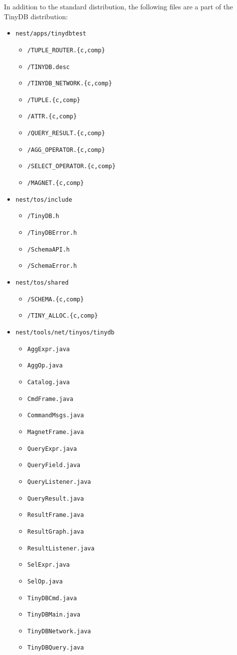\documentclass[11pt]{article}
\renewcommand{\baselinestretch}{1.2}
\begin{document}
In addition to the standard distribution, the following files are a
part of the TinyDB distribution:

\renewcommand{\baselinestretch}{.9}\rm
\begin{itemize}
\item {\tt nest/apps/tinydbtest}
\begin{itemize}
\item {\tt /TUPLE\_ROUTER.\{c,comp\}}
\item {\tt /TINYDB.desc}
\item {\tt /TINYDB\_NETWORK.\{c,comp\}}
\item {\tt /TUPLE.\{c,comp\}}
\item {\tt /ATTR.\{c,comp\}}
\item {\tt /QUERY\_RESULT.\{c,comp\}}
\item {\tt /AGG\_OPERATOR.\{c,comp\}}
\item {\tt /SELECT\_OPERATOR.\{c,comp\}}
\item {\tt /MAGNET.\{c,comp\}}
\end{itemize}
\item {\tt nest/tos/include}
\begin{itemize}
\item {\tt /TinyDB.h}
\item {\tt /TinyDBError.h}
\item {\tt /SchemaAPI.h}
\item {\tt /SchemaError.h}
\end{itemize}
\item {\tt nest/tos/shared}
\begin{itemize}
\item {\tt /SCHEMA.\{c,comp\}}
\item {\tt /TINY\_ALLOC.\{c,comp\}}
\end{itemize}
\item {\tt nest/tools/net/tinyos/tinydb}
\begin{itemize}
\item {\tt AggExpr.java}
\item {\tt AggOp.java}
\item {\tt Catalog.java}
\item {\tt CmdFrame.java}
\item {\tt CommandMsgs.java}
\item {\tt MagnetFrame.java}
\item {\tt QueryExpr.java}
\item {\tt QueryField.java}
\item {\tt QueryListener.java}
\item {\tt QueryResult.java}
\item {\tt ResultFrame.java}
\item {\tt ResultGraph.java}
\item {\tt ResultListener.java}
\item {\tt SelExpr.java}
\item {\tt SelOp.java}
\item {\tt TinyDBCmd.java}
\item {\tt TinyDBMain.java}
\item {\tt TinyDBNetwork.java}
\item {\tt TinyDBQuery.java}
\end{itemize}
\end{itemize}
\end{document}
